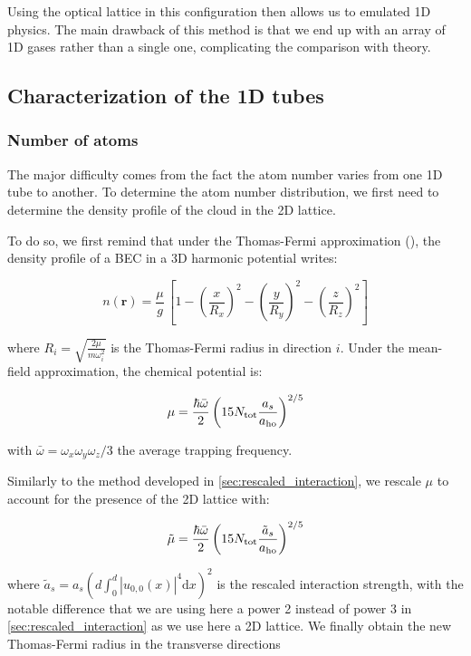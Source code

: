 Using the optical lattice in this configuration then allows us to emulated 1D physics. The main drawback of this method is that we end up with an array of 1D gases rather than a single one, complicating the comparison with theory.


\subsection{Characterization of the 1D tubes}

\subsubsection{Number of atoms}

The major difficulty comes from the fact the atom number varies from one 1D tube to another. To determine the atom number distribution, we first need to determine the density profile of the cloud in the 2D lattice.

To do so, we first remind that under the Thomas-Fermi approximation (), the density profile of a BEC in a 3D harmonic potential writes:

\begin{equation}
     n(\bm{r}) = \frac{\mu}{g} \, \left[ 1 - \left( \frac{x}{R_x} \right)^2 - \left( \frac{y}{R_y} \right)^2 - \left( \frac{z}{R_z} \right)^2 \right]
\end{equation}

\noindent where $R_i = \sqrt{\frac{2 \mu}{m \omega_i^2}}$ is the Thomas-Fermi radius in direction $i$. Under the mean-field approximation, the chemical potential is:

\begin{equation}
     \mu = \frac{\hbar \bar{\omega}}{2} \left(  15 N_{\rm{tot}} \frac{a_s}{a_{\rm{ho}}}\right)^{2/5}
\end{equation}

\noindent with $\bar{\omega}=\omega_x \omega_y \omega_z/3$ the average trapping frequency.

Similarly to the method developed in \ref{sec:rescaled_interaction}, we rescale $\mu$ to account for the presence of the 2D lattice with:

\begin{equation}
    \tilde{\mu} = \frac{\hbar \bar{\omega}}{2} \left(  15 N_{\rm{tot}} \frac{\tilde{a}_s}{a_{\rm{ho}}}\right)^{2/5}
\end{equation}

\noindent where $\tilde{a}_s= a_s \left(d \int_0^d |u_{0,0} (x)|^4 \mathrm{d}x \right)^2$ is the rescaled interaction strength, with the notable difference that we are using here a power 2 instead of power 3 in \ref{sec:rescaled_interaction} as we use here a 2D lattice.  We finally obtain the new Thomas-Fermi radius in the transverse directions

